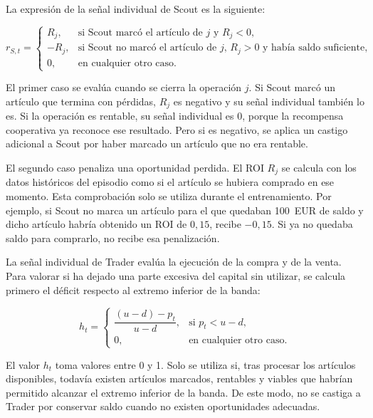 La expresión de la señal individual de Scout es la siguiente:

\begin{equation}
r_{S,t}=
\begin{cases}
R_j,
& \text{si Scout marcó el artículo de } j \text{ y } R_j<0, \\
-R_j,
& \text{si Scout no marcó el artículo de } j \text{, } R_j>0 \text{ y había saldo suficiente}, \\
0,
& \text{en cualquier otro caso}.
\end{cases}
\label{eq:recompensa-scout}
\end{equation}

El primer caso se evalúa cuando se cierra la operación $j$. Si Scout marcó un artículo que termina con pérdidas, $R_j$ es negativo y su señal individual también lo es. Si la operación es rentable, su señal individual es $0$, porque la recompensa cooperativa ya reconoce ese resultado. Pero si es negativo, se aplica un castigo adicional a Scout por haber marcado un artículo que no era rentable.

El segundo caso penaliza una oportunidad perdida. El ROI $R_j$ se calcula con los datos históricos del episodio como si el artículo se hubiera comprado en ese momento. Esta comprobación solo se utiliza durante el entrenamiento. Por ejemplo, si Scout no marca un artículo para el que quedaban 100~EUR de saldo y dicho artículo habría obtenido un ROI de $0{,}15$, recibe $-0{,}15$. Si ya no quedaba saldo para comprarlo, no recibe esa penalización.

La señal individual de Trader evalúa la ejecución de la compra y de la venta. Para valorar si ha dejado una parte excesiva del capital sin utilizar, se calcula primero el déficit respecto al extremo inferior de la banda:

\begin{equation}
h_t=
\begin{cases}
\dfrac{(u-d)-p_t}{u-d},
& \text{si } p_t<u-d, \\
0,
& \text{en cualquier otro caso}.
\end{cases}
\label{eq:deficit-inversion}
\end{equation}

El valor $h_t$ toma valores entre 0 y 1. Solo se utiliza si, tras procesar los artículos disponibles, todavía existen artículos marcados, rentables y viables que habrían permitido alcanzar el extremo inferior de la banda. De este modo, no se castiga a Trader por conservar saldo cuando no existen oportunidades adecuadas.


